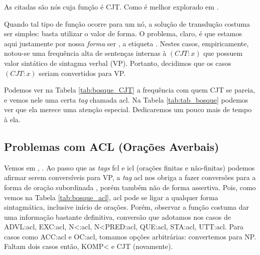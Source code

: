 As  citadas são nós cuja função é CJT. Como é melhor explorado em \cite[p~96]{afonso2006arvores} .

Quando tal tipo de função ocorre para um nó, a solução de transdução costuma ser simples: basta utilizar o valor de forma. O problema, claro, é que estamos aqui justamente por nossa \textit{forma} ser , a etiqueta . Nestes casos, empiricamente, notou-se uma frequência alta de sentenças internas à $(CJT:x)$ que possuem valor sintático de sintagma verbal (VP). Portanto, decidimos que os casos $(CJT:x)$ seriam convertidos para VP.
\begin{center}
    
\end{center}

Podemos ver na Tabela \ref{tab:bosque_CJT} a frequência com quem CJT se pareia, e vemos nele uma certa \textit{tag} chamada acl. Na Tabela \ref{tab:tab_bosque} podemos ver que ela merece uma atenção especial. Dedicaremos um pouco mais de tempo à ela.
\subsection{Problemas com ACL (Orações Averbais)}
\label{subsec:tag_acl}
Vemos em \cite{freitas2007biblia}, . Ao passo que as \textit{tags} fcl e icl (orações finitas e não-finitas) podemos afirmar serem conversíveis para VP, a \textit{tag} acl nos obriga a fazer conversões para a forma de oração subordinada \cite[p~172]{bracketing_ptb}, porém também não de forma assertiva. Pois, como vemos na Tabela \ref{tab:bosque_acl}, acl pode se ligar a qualquer forma sintagmática, inclusive início de orações. Porém, observar a função costuma dar uma informação bastante definitiva, conversão que adotamos nos casos de ADVL:acl, EXC:acl, N<:acl, N<PRED:acl, QUE:acl, STA:acl, UTT:acl. Para casos como ACC:acl e OC:acl, tomamos opções arbitrárias: convertemos para NP. Faltam dois casos então, KOMP< e CJT (novamente).
\begin{center}
    
\end{center}
